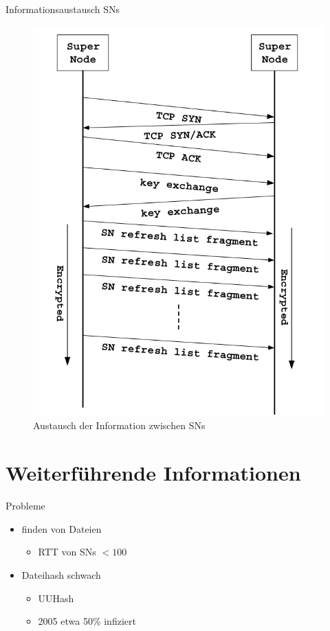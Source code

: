 \documentclass[ucs,9pt]{beamer}
\begin{document}
\begin{frame}{Informationsaustausch SNs}
\begin{figure}
\includegraphics[scale=0.25]{images/SnToSn}
\caption{Austausch der Information zwischen SNs}
\end{figure}
\end{frame}

\section{Weiterführende Informationen}

\begin{frame}{Probleme}
\begin{itemize}
\item finden von Dateien
\begin{itemize}
\item RTT von SNs $< 100$
\end{itemize}
\item Dateihash schwach 
	\begin{itemize}
		\item UUHash
		\item 2005 etwa 50\% infiziert \cite{uuHash}
	\end{itemize}
\end{itemize}
\end{frame}
\end{document}

